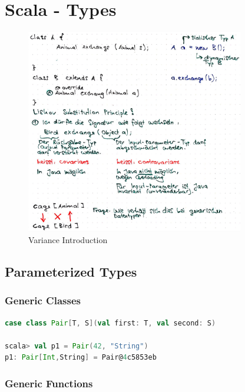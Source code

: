 \hypertarget{scala-types}{%
\section{Scala - Types}\label{scala-types}}

\begin{figure}[H]
\centering
\includegraphics[width=0.85\textwidth]{figures/scalaVarianceIntro.png}
\caption{Variance Introduction}
\end{figure}

\hypertarget{parameterized-types}{%
\subsection{Parameterized Types}\label{parameterized-types}}

\hypertarget{generic-classes}{%
\subsubsection{Generic Classes}\label{generic-classes}}

\begin{lstlisting}[language=scala,mathescape=false]
case class Pair[T, S](val first: T, val second: S)

scala> val p1 = Pair(42, "String")
p1: Pair[Int,String] = Pair@4c5853eb
\end{lstlisting}

\hypertarget{generic-functions}{%
\subsubsection{Generic Functions}\label{generic-functions}}

